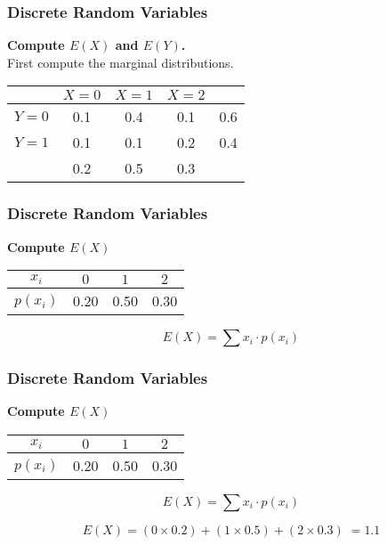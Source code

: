 \documentclass{beamer}
\begin{document}
\begin{frame}
\frametitle{Discrete Random Variables}
\Large
\vspace{-1.5cm}
\textbf{Compute $E(X)$ and $E(Y)$.}\\
First compute the marginal distributions.

\begin{center}
\begin{tabular}{|c|c|c|c||c|}
\hline  & $X=0$ & $X=1$ & $X=2$  &\phantom{spaces}\\ 
\hline $Y=0$ & 0.1  & 0.4 & 0.1 & 0.6\\ 
\hline  $Y=1$ & 0.1 & 0.1 & 0.2 & 0.4\\ \hline
\hline & 0.2& 0.5& 0.3& \\
\hline 
\end{tabular} 
\end{center}

\end{frame}

\begin{frame}
\frametitle{Discrete Random Variables}
\Large
\vspace{-1.5cm}
\textbf{Compute $E(X)$}
\begin{center}
\begin{tabular}{|c|c|c|c|}
\hline $x_i$ & $0$ & $1$ & $2$  \\ 
\hline $p(x_i)$& 0.20 & 0.50 & 0.30 \\
\hline 
\end{tabular} 
\end{center}

\[ E(X) =  \sum  x_i \cdot p(x_i)   \]


\end{frame}

\begin{frame}
\frametitle{Discrete Random Variables}
\Large
\vspace{-1.5cm}
\textbf{Compute $E(X)$}
\begin{center}
\begin{tabular}{|c|c|c|c|}
\hline $x_i$ & $0$ & $1$ & $2$  \\ 
\hline $p(x_i)$& 0.20 & 0.50 & 0.30 \\
\hline 
\end{tabular} 
\end{center}

\[ E(X) =  \sum  x_i \cdot p(x_i)   \]

\[E(X) =(0\times 0.2) + (1 \times 0.5) + (2 \times 0.3)\;  = 1.1\]

\end{frame}
\end{document}
